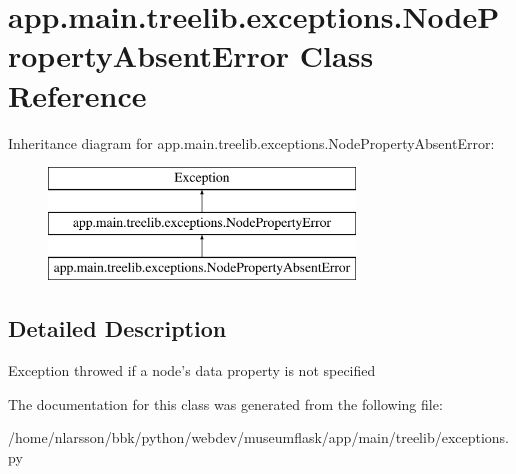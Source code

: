 \hypertarget{classapp_1_1main_1_1treelib_1_1exceptions_1_1NodePropertyAbsentError}{}\section{app.\+main.\+treelib.\+exceptions.\+Node\+Property\+Absent\+Error Class Reference}
\label{classapp_1_1main_1_1treelib_1_1exceptions_1_1NodePropertyAbsentError}
Inheritance diagram for app.\+main.\+treelib.\+exceptions.\+Node\+Property\+Absent\+Error\+:\begin{figure}[H]
\begin{center}
\leavevmode
\includegraphics[height=3.000000cm]{classapp_1_1main_1_1treelib_1_1exceptions_1_1NodePropertyAbsentError}
\end{center}
\end{figure}


\subsection{Detailed Description}
\begin{DoxyVerb}Exception throwed if a node's data property is not specified\end{DoxyVerb}
 

The documentation for this class was generated from the following file\+:\begin{DoxyCompactItemize}
\item 
/home/nlarsson/bbk/python/webdev/museumflask/app/main/treelib/exceptions.\+py\end{DoxyCompactItemize}
